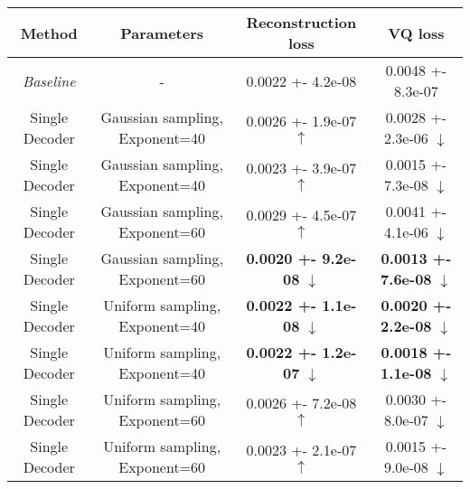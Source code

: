 \centering
\scriptsize
\begin{tabular}{||c|c|c|c||}
\hline
 Method & Parameters & Reconstruction loss & VQ loss \\
\hline
\textit{Baseline} & - & 0.0022 +- 4.2e-08 & 0.0048 +- 8.3e-07 \\
\hline
Single Decoder & Gaussian sampling, Exponent=40 & 0.0026 +- 1.9e-07  $\uparrow$ & 0.0028 +- 2.3e-06  $\downarrow$ \\
\hline
Single Decoder & Gaussian sampling, Exponent=40 & 0.0023 +- 3.9e-07  $\uparrow$ & 0.0015 +- 7.3e-08  $\downarrow$ \\
\hline
Single Decoder & Gaussian sampling, Exponent=60 & 0.0029 +- 4.5e-07  $\uparrow$ & 0.0041 +- 4.1e-06  $\downarrow$ \\
\hline
Single Decoder & Gaussian sampling, Exponent=60 & \textbf{0.0020 +- 9.2e-08}  $\downarrow$ & \textbf{0.0013 +- 7.6e-08}  $\downarrow$ \\
\hline
Single Decoder & Uniform sampling, Exponent=40 & \textbf{0.0022 +- 1.1e-08}  $\downarrow$ & \textbf{0.0020 +- 2.2e-08}  $\downarrow$ \\
\hline
Single Decoder & Uniform sampling, Exponent=40 & \textbf{0.0022 +- 1.2e-07}  $\downarrow$ & \textbf{0.0018 +- 1.1e-08}  $\downarrow$ \\
\hline
Single Decoder & Uniform sampling, Exponent=60 & 0.0026 +- 7.2e-08  $\uparrow$ & 0.0030 +- 8.0e-07  $\downarrow$ \\
\hline
Single Decoder & Uniform sampling, Exponent=60 & 0.0023 +- 2.1e-07  $\uparrow$ & 0.0015 +- 9.0e-08  $\downarrow$ \\
\hline
\end{tabular}
